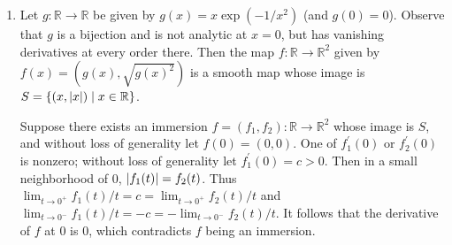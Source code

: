 \documentclass[11pt,leqno]{article}
\theoremstyle{plain}
\theoremstyle{definition}
\numberwithin{equation}{section}
\numberwithin{lem}{section}
\newcommand{\cbr}[1]{\left\{#1\right\}}
\begin{document}
\begin{enumerate}
\begin{enumerate}
    \end{enumerate}
    \item Let $g\colon \mathbb R\to\mathbb R$ be given by $g(x) = x\exp(-1/x^2)$ (and $g(0) = 0$). Observe that $g$ is a bijection and is not analytic at $x = 0$, but has vanishing derivatives at every order there. Then the map $f\colon\mathbb R\to \mathbb R^2$ given by $f(x) = (g(x),\sqrt{g(x)^2})$ is a smooth map whose image is $S = \cbr{(x,\abs{x})\mid x\in\mathbb R}$. 
    
    Suppose there exists an immersion $f = (f_1,f_2) \colon \mathbb R\to\mathbb R^2$ whose image is $S$, and without loss of generality let $f(0) = (0,0)$. One of $f_1^\prime(0)$ or $f_2^\prime(0)$ is nonzero; without loss of generality let $f_1^\prime(0) = c > 0$. Then in a small neighborhood of $0$, $\abs{f_1(t)} = f_2(t)$. Thus $\lim_{t\to 0^+} f_1(t)/t = c = \lim_{t\to 0^+} f_2(t)/t$ and $\lim_{t\to 0^-} f_1(t)/t = -c = -\lim_{t\to 0^-} f_2(t)/t$. It follows that the derivative of $f$ at $0$ is $0$, which contradicts $f$ being an immersion.
\end{enumerate}
\end{document}
